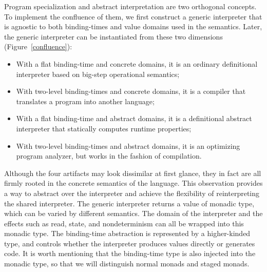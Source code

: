 Program specialization and abstract interpretation are two orthogonal
concepts.  To implement the confluence of them, we first construct a
generic interpreter that is agnostic to both binding-times and value
domains used in the semantics.  Later, the generic interpreter can be
instantiated from these two dimensions (Figure~\ref{confluence}):
\begin{itemize}
\item With a flat binding-time and concrete domains, it is an ordinary
  definitional interpreter based on big-step operational semantics;
\item With two-level binding-times and concrete domains, it is a
  compiler that translates a program into another language;
\item With a flat binding-time and abstract domains, it is a
  definitional abstract interpreter \cite{DBLP:journals/pacmpl/DaraisLNH17}
  that statically computes runtime properties;
\item With two-level binding-times and abstract domains, it is an optimizing
  program analyzer, but works in the fashion of compilation.
\end{itemize}

Although the four artifacts may look dissimilar at first glance, they in
fact are all firmly rooted in the concrete semantics of the language.  This
observation provides a way to abstract over the interpreter and achieve the
flexibility of reinterpreting the shared interpreter.  The generic interpreter
returns a value of monadic type, which can be varied by different semantics.
The domain of the interpreter and the effects such as read, state, and
nondeterminism can all be wrapped into this monadic type.  The binding-time
abstraction is represented by a higher-kinded type, and controls whether the
interpreter produces values directly or generates code. It is worth mentioning
that the binding-time type is also injected into the monadic type, so that we
will distinguish normal monads and staged monads.

